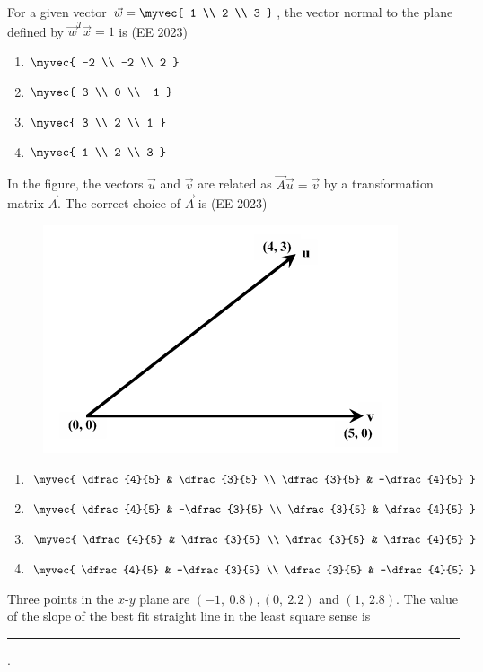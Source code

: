 \item For a given vector $\vec{w} = \myvec{ 1 \\ 2 \\ 3 }$, the vector normal to the plane defined by $\vec{w}^T \vec{x} = 1$ is \hfill{(EE 2023)}
\begin{multicols}{4}
\begin{enumerate}
    \item $\myvec{ -2 \\ -2 \\ 2 }$
    \item $\myvec{ 3 \\ 0 \\ -1 }$
    \item $\myvec{ 3 \\ 2 \\ 1 }$
    \item $\myvec{ 1 \\ 2 \\ 3 }$
\end{enumerate}
\end{multicols}
\item In the figure, the vectors $\vec{u}$ and $\vec{v}$ are related as $\vec{A}\vec{u} = \vec{v}$ by a transformation matrix $\vec{A}$. The correct choice of $\vec{A}$ is \hfill{(EE 2023)}
\begin{figure}[H]
    \centering
    \includegraphics[width=0.5\columnwidth]{GATE/2023/EE/figs/Q 24.png}
    \caption{}
    \label{fig:placeholder/2023/33}
\end{figure}
\begin{multicols}{4}
\begin{enumerate}
    \item $ \myvec{
\dfrac{4}{5} & \dfrac{3}{5} \\
\dfrac{3}{5} & -\dfrac{4}{5}
}$
    \item $ \myvec{
\dfrac{4}{5} & -\dfrac{3}{5} \\
\dfrac{3}{5} & \dfrac{4}{5}
}$
    \item $ \myvec{
\dfrac{4}{5} & \dfrac{3}{5} \\
\dfrac{3}{5} & \dfrac{4}{5}
}$
    \item $ \myvec{
\dfrac{4}{5} & -\dfrac{3}{5} \\
\dfrac{3}{5} & -\dfrac{4}{5}
}$
\end{enumerate}
\end{multicols}
\item Three points in the $x$-$y$ plane are $(-1,~0.8), (0,~2.2)$ and $(1,~2.8)$. The value of the slope of the best fit straight line in the least square sense is \rule{2cm}{0.15mm}. 

